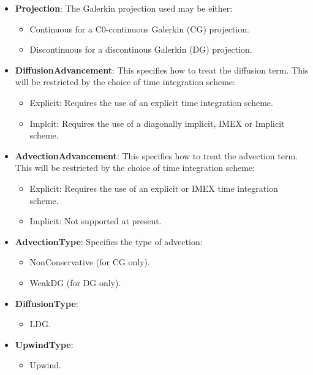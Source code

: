 \begin{itemize}
\begin{table}[h!]
\begin{center}
\begin{tabular}{|c|c|c|c|c|}
\end{tabular}
\end{center}
\label{t:ADR2}
\end{table}
\vspace{-1 cm}
\item \textbf{Projection}: The Galerkin projection used may be either:
\begin{itemize}
	\item Continuous for a C0-continuous Galerkin (CG) projection.
	\item Discontinuous for a discontinous Galerkin (DG) projection.
\end{itemize}
\item \textbf{DiffusionAdvancement}: This specifies how to treat the diffusion term. This will be restricted by the choice of time integration scheme:
\begin{itemize}
	\item Explicit: Requires the use of an explicit time integration scheme.
	\item Implcit: Requires the use of a diagonally implicit, IMEX or Implicit scheme.
\end{itemize}
\item \textbf{AdvectionAdvancement}: This specifies how to treat the advection term. This will be restricted by the choice of time integration scheme:
\begin{itemize}
	\item Explicit: Requires the use of an explicit or IMEX time integration scheme.
	\item Implicit: Not supported at present.
\end{itemize}
\item \textbf{AdvectionType}: Specifies the type of advection:
\begin{itemize}
	\item NonConservative (for CG only).
	\item WeakDG (for DG only).
\end{itemize}
\item \textbf{DiffusionType}:
\begin{itemize}
	\item LDG.
\end{itemize}
\item \textbf{UpwindType}:
\begin{itemize}
	\item Upwind.
\end{itemize}
\end{itemize}

